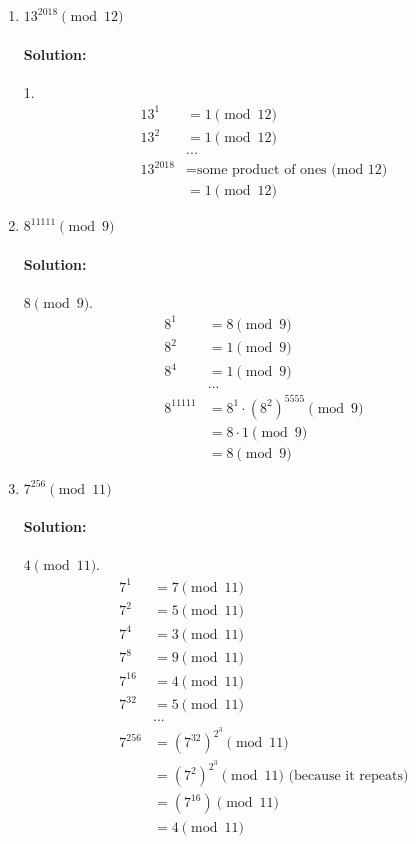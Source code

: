 \documentclass[11pt, notitlepage]{report}
\newenvironment{solution}{\paragraph{Solution:}}{\hfill}
\begin{document}
\begin{enumerate}[label=(\alph*)]

\item $13^{2018} \pmod {12}$
\begin{solution} 1.
	\begin{align*}
		13^1&=1\pmod{12}\\
		13^2&=1\pmod{12} \\
		&... \\
		13^{2018}&=\text{some product of ones (mod 12)}\\&=1\pmod{12}
	\end{align*}
\end{solution}
\item $8^{11111} \pmod 9$
\begin{solution} $8\pmod{9}$.
	\begin{align*}
		8^1&=8\pmod{9}\\
		8^2&=1\pmod{9} \\
		8^4&=1\pmod{9} \\
		&... \\
		8^{11111}&=8^1\cdot(8^2)^{5555}\pmod{9}\\
		&=8\cdot 1\pmod{9}\\
		&=8 \pmod{9}
	\end{align*}
\end{solution}
\item $7^{256} \pmod {11}$
\begin{solution} $4\pmod{11}$.
	\begin{align*}
		7^1&=7\pmod{11}\\
		7^2&=5\pmod{11} \\
		7^4&=3\pmod{11} \\
		7^8&=9\pmod{11} \\
		7^{16}&=4\pmod{11} \\
		7^{32}&=5\pmod{11} \\
		&... \\
		7^{256}&=(7^{32})^{2^3}\pmod{11}\\
		&=(7^{2})^{2^3}\pmod{11} \text{ (because it repeats)}\\
		&=(7^{16})\pmod{11}\\
		&=4 \pmod{11}
	\end{align*}
\end{solution}


\end{enumerate}
\end{document}
